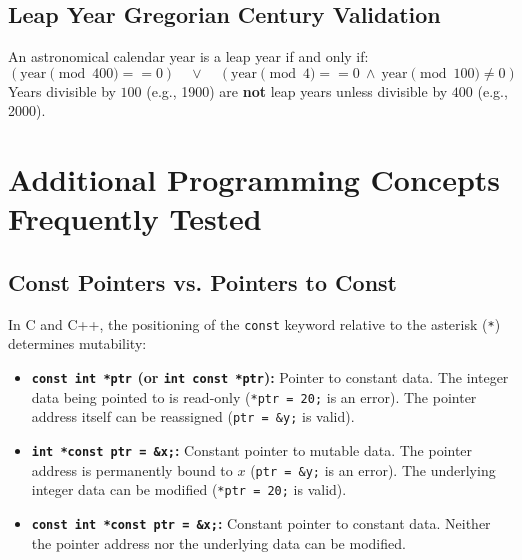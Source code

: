 \subsection{Leap Year Gregorian Century Validation}
An astronomical calendar year is a leap year if and only if:
\[
(\text{year} \pmod{400} == 0) \quad \lor \quad (\text{year} \pmod 4 == 0 \ \land \ \text{year} \pmod{100} \ne 0)
\]
Years divisible by $100$ (e.g., 1900) are \textbf{not} leap years unless divisible by $400$ (e.g., 2000).

\section{Additional Programming Concepts Frequently Tested}
\label{sec:additional_frequently_tested_concepts}

\subsection{Const Pointers vs. Pointers to Const}
In C and C++, the positioning of the \texttt{const} keyword relative to the asterisk (\texttt{*}) determines mutability:
\begin{itemize}[leftmargin=*]
    \item \textbf{\texttt{const int *ptr} (or \texttt{int const *ptr}):} Pointer to constant data. The integer data being pointed to is read-only (\texttt{*ptr = 20;} is an error). The pointer address itself can be reassigned (\texttt{ptr = \&y;} is valid).
    \item \textbf{\texttt{int *const ptr = \&x;}:} Constant pointer to mutable data. The pointer address is permanently bound to $x$ (\texttt{ptr = \&y;} is an error). The underlying integer data can be modified (\texttt{*ptr = 20;} is valid).
    \item \textbf{\texttt{const int *const ptr = \&x;}:} Constant pointer to constant data. Neither the pointer address nor the underlying data can be modified.
\end{itemize}

